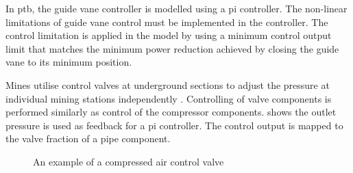 	
		In \gls{ptb}, the guide vane controller is modelled using a \gls{pi} controller. The non-linear limitations of guide vane control must be implemented in the controller. The control limitation is applied in the model by using a minimum control output limit that matches the minimum power reduction achieved by closing the guide vane to its minimum position. 
		\par 
		Mines utilise control valves at underground sections to adjust the pressure at individual mining stations independently \cite{Heyns2014Masters}. Controlling of valve components is performed similarly as control of the compressor components.  shows the outlet pressure is used as feedback for a \gls{pi} controller. The control output is mapped to the valve fraction of a pipe component.

		\begin{figure}[h]
			\centering
			\caption[An example of a compressed air control valve]{An example of a compressed air control valve\cite{van2015implementation}} 
			\label{fig: Control}
		\end{figure}
